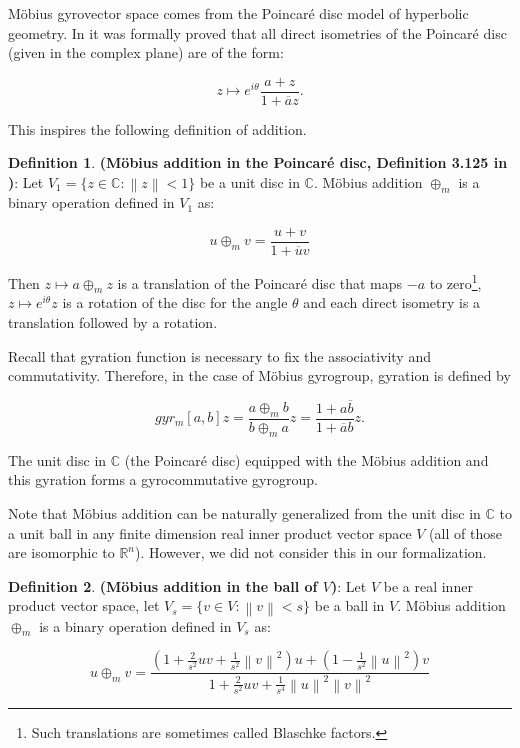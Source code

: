 \documentclass[a4paper]{article}
\theoremstyle{definition}
\newtheorem{definition}{Definition}[section]
\newcommand{\norm}[1]{\left\lVert#1\right\rVert}
\begin{document}
M\"obius gyrovector space comes from the Poincar\'e disc model of
hyperbolic geometry. In \cite{amai-poincare} it was formally proved
that all direct isometries of the Poincar\'e disc (given in the
complex plane) are of the form:

$$z \mapsto e^{i\theta} \frac{a+z}{1+\overline{a}z}.$$

This inspires the following definition of addition.

\begin{definition}\textbf{(M\" obius addition in the Poincar\'e disc, Definition 3.125 in \cite{ungar-analytic})}: Let 
  $V_1 = \{z\in \mathbb{C}: \norm{z} < 1\}$ be a unit disc in
  $\mathbb{C}$. M\" obius addition $\oplus_m$ is a binary operation
  defined in $V_1$ as:
  
  $$u\oplus_m v = \frac{u+v}{1+\overline{u}v}$$
\end{definition}

Then $z \mapsto a \oplus_m z$ is a translation of the Poincar\'e disc
that maps $-a$ to zero\footnote{Such translations are sometimes called
  Blaschke factors.}, $z \mapsto e^{i\theta}z$ is a rotation of the
disc for the angle $\theta$ and each direct isometry is a translation
followed by a rotation.

Recall that gyration function is necessary to fix the associativity
and commutativity. Therefore, in the case of M\"obius gyrogroup,
gyration is defined by

$$gyr_m[a, b] z = \frac{a\oplus_m b}{b\oplus_m a}z = \frac{1 + a\overline{b}}{1+\overline{a}b}z.$$

The unit disc in $\mathbb{C}$ (the Poincar\'e disc) equipped with the
M\"obius addition and this gyration forms a gyrocommutative gyrogroup.


Note that M\"obius addition can be naturally generalized from the unit
disc in $\mathbb{C}$ to a unit ball in any finite dimension real inner
product vector space $V$ (all of those are isomorphic to
$\mathbb{R}^n$). However, we did not consider this in our
formalization.

\begin{definition}\textbf{(M\" obius addition in the ball of $V$)}: Let $V$
  be a real inner product vector space, let
  $V_{s} = \{v\in V: \norm{v}<s\}$ be a ball in $V$. M\" obius
  addition $\oplus_m$ is a binary operation defined in $V_s$ as:
  
$$u \oplus_m v = \frac{(1+\frac{2}{s^2}uv+\frac{1}{s^2}\norm{v}^2)u+(1-\frac{1}{s^2}\norm{u}^2)v}{1+\frac{2}{s^2}uv+\frac{1}{s^4}\norm{u}^2\norm{v}^2}$$ 
\end{definition}
\end{document}
